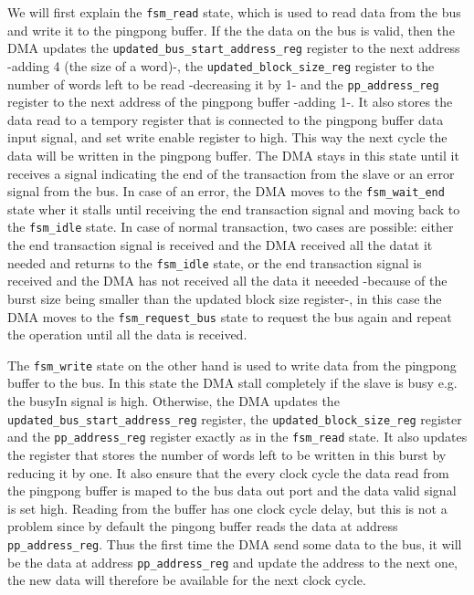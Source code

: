 \documentclass[a4paper,11pt,oneside]{report}
\begin{document}
We will first explain the \texttt{fsm\_read} state, which is used to read data from the bus and write it to the pingpong buffer.
If the the data on the bus is valid, then the DMA updates the \texttt{updated\_bus\_start\_address\_reg} register to the next address -adding 4 (the size of a word)-, the 
\texttt{updated\_block\_size\_reg} register to the number of words left to be read -decreasing it by 1- and the \texttt{pp\_address\_reg} register to the next address of the pingpong buffer -adding 1-.
It also stores the data read to a tempory register that is connected to the pingpong buffer data input signal, and set write enable register to high. This way the next cycle the data will be written in the pingpong buffer.
The DMA stays in this state until it receives a signal indicating the end of the transaction from the slave or an error signal from the bus.
In case of an error, the DMA moves to the \texttt{fsm\_wait\_end} state wher it stalls until receiving the end transaction signal and moving back to the \texttt{fsm\_idle} state.
In case of normal transaction, two cases are possible: either the end transaction signal is received and the DMA received all the datat it needed and returns to the \texttt{fsm\_idle} state, 
or the end transaction signal is received and the DMA has not received all the data it neeeded -because of the burst size being smaller than the updated block size register-, in this case 
the DMA moves to the \texttt{fsm\_request\_bus} state to request the bus again and repeat the operation until all the data is received.

The \texttt{fsm\_write} state on the other hand is used to write data from the pingpong buffer to the bus.
In this state the DMA stall completely if the slave is busy e.g. the busyIn signal is high.
Otherwise, the DMA updates the \texttt{updated\_bus\_start\_address\_reg} register, the \texttt{updated\_block\_size\_reg} register and the \texttt{pp\_address\_reg} register exactly as in the \texttt{fsm\_read} state.
It also updates the register that stores the number of words left to be written in this burst by reducing it by one.
It also ensure that the every clock cycle the data read from the pingpong buffer is maped to the bus data out port and the data valid signal is set high.
Reading from the buffer has one clock cycle delay, but this is not a problem since by default the pingong buffer reads the data at address \texttt{pp\_address\_reg}. 
Thus the first time the DMA send some data to the bus, it will be the data at address \texttt{pp\_address\_reg} and update the address to the next one, the new data will therefore be available for the next clock cycle.
\end{document}
